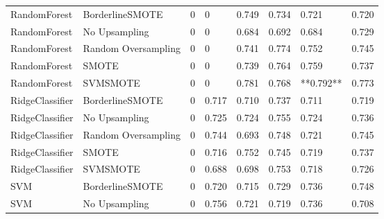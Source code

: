\begin{tabular}{llllllll}
                RandomForest &     BorderlineSMOTE &     0 &                         0 &                 0.749 &                  0.734 &                                   0.721 &    0.720 \\
                RandomForest &       No Upsampling &     0 &                         0 &                 0.684 &                  0.692 &                                   0.684 &    0.729 \\
                RandomForest & Random Oversampling &     0 &                         0 &                 0.741 &                  0.774 &                                   0.752 &    0.745 \\
                RandomForest &               SMOTE &     0 &                         0 &                 0.739 &                  0.764 &                                   0.759 &    0.737 \\
                RandomForest &            SVMSMOTE &     0 &                         0 &                 0.781 &                  0.768 &                               **0.792** &    0.773 \\
             RidgeClassifier &     BorderlineSMOTE &     0 &                     0.717 &                 0.710 &                  0.737 &                                   0.711 &    0.719 \\
             RidgeClassifier &       No Upsampling &     0 &                     0.725 &                 0.724 &                  0.755 &                                   0.724 &    0.736 \\
             RidgeClassifier & Random Oversampling &     0 &                     0.744 &                 0.693 &                  0.748 &                                   0.721 &    0.745 \\
             RidgeClassifier &               SMOTE &     0 &                     0.716 &                 0.752 &                  0.745 &                                   0.719 &    0.737 \\
             RidgeClassifier &            SVMSMOTE &     0 &                     0.688 &                 0.698 &                  0.753 &                                   0.718 &    0.726 \\
                         SVM &     BorderlineSMOTE &     0 &                     0.720 &                 0.715 &                  0.729 &                                   0.736 &    0.748 \\
                         SVM &       No Upsampling &     0 &                     0.756 &                 0.721 &                  0.719 &                                   0.736 &    0.708 \\

\end{tabular}
